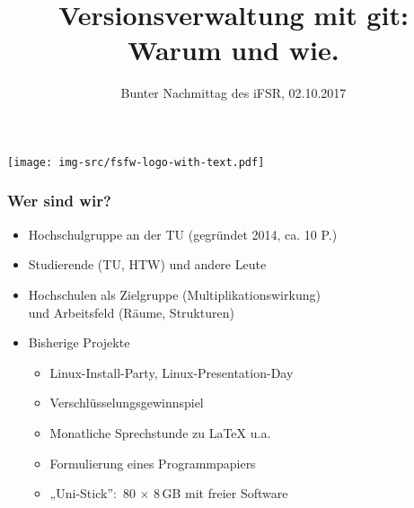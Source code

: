 \documentclass{beamer}
\title{Versionsverwaltung mit git: Warum und wie.}
\subtitle{Bunter Nachmittag des iFSR, 02.10.2017}
\begin{document}
\begin{frame}
  \begin{center}%
    \texttt{[image: img-src/fsfw-logo-with-text.pdf]}\\

    \vspace*{-0.5\baselineskip}

    \parbox{.95\columnwidth}{\centering\Large\inserttitle}

    \vspace*{\baselineskip}

    \structure{\large \insertsubtitle}
  \end{center}
\end{frame}

\begin{frame}[label=wb]

\begin{center}
 \vspace{10mm}
\end{center}
 
\end{frame}



\begin{frame}[label=ct1]
  \frametitle{Wer sind wir?}

  \onslide<+->

  \begin{itemize}
  \item Hochschulgruppe an der TU (gegründet 2014, ca. 10 P.)
  \item Studierende (TU, HTW) und andere Leute
  \item Hochschulen als Zielgruppe (Multiplikationswirkung)\\
    und Arbeitsfeld (Räume, Strukturen)

    \bigskip\onslide<+->

  \item Bisherige Projekte
    \begin{itemize}
    \item Linux-Install-Party, Linux-Presentation-Day
    \item Verschlüsselungsgewinnspiel
    \item Monatliche Sprechstunde zu \LaTeX{} u.a.
    \item Formulierung eines Programmpapiers
    \item „Uni-Stick”:~80 $\times$ 8\,GB mit freier Software
    \end{itemize}
  \end{itemize}
\end{frame}
\end{document}
